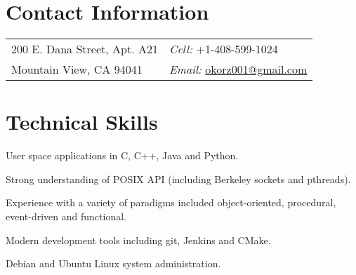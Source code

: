 
\section{Contact Information}
%
%
%
\newlength{\rcollength}\setlength{\rcollength}{2.25in}%
%
\begin{tabular}[t]{@{}p{\textwidth-\rcollength}p{\rcollength}}
  200 E. Dana Street, Apt. A21 & \textit{Cell:} +1-408-599-1024\\
  Mountain View, CA 94041 & \textit{Email:}
  \href{mailto:okorz001@gmail.com}{okorz001@gmail.com}\\
\end{tabular}


\section{Technical Skills}
\begin{lonelist}
\item[]
\begin{innerlist}
\item User space applications in C, C++, Java and Python.

\item Strong understanding of POSIX API (including Berkeley sockets and
    pthreads).

\item Experience with a variety of paradigms included object-oriented,
    procedural, event-driven and functional.

\item Modern development tools including git, Jenkins and CMake.

\item Debian and Ubuntu Linux system administration.
\end{innerlist}
\end{lonelist}


